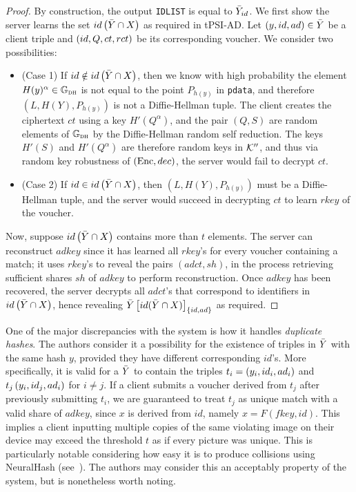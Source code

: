 \begin{proof}
By construction, the output \texttt{IDLIST} is equal to $\bar{Y}_{id}$. We first show the server learns the set  $id \left(\bar{Y} \cap X\right)$ as required in tPSI-AD.  Let $\left(y, id, ad\right) \in \bar{Y}$ be a client triple and $\left(id, Q, ct, rct\right)$ be its corresponding voucher. We consider two possibilities:
\begin{itemize}
    \item (Case 1) If $id \notin id \left(\bar{Y} \cap X\right)$, then we know with high probability the element $H(y)^\alpha \in \mathbb{G}_{\textsc{dh}}$ is not equal to the point $P_{h(y)}$ in \texttt{pdata}, and therefore $(L, H(Y), P_{h(y)})$ is not a Diffie-Hellman tuple. The client creates the ciphertext $ct$ using a key $H'(Q^\alpha)$, and the pair $(Q,S)$ are random elements of $\mathbb{G}_{\textsc{dh}}$ by the Diffie-Hellman random self reduction. The keys $H'(S)$ and $H'(Q^\alpha)$ are therefore random keys in $\mathcal{K}''$, and thus via random key robustness of $(\text{Enc}, dec)$, the server would fail to decrypt $ct$.

    \item (Case 2) If $id \in id \left(\bar{Y} \cap X\right)$, then $(L, H(Y), P_{h(y)})$ must be a Diffie-Hellman tuple, and the server would succeed in decrypting $ct$ to learn $rkey$ of the voucher.
\end{itemize}
Now, suppose $ id \left(\bar{Y} \cap X\right)$ contains more than $t$ elements. The server can reconstruct $adkey$ since it has learned all $rkey$'s for every voucher containing a match; it uses $rkey$'s to reveal the pairs $(adct, sh)$, in the process retrieving sufficient shares $sh$ of $adkey$ to perform reconstruction. Once $adkey$ has been recovered, the server decrypts all $adct$'s that correspond to identifiers in $ id \left(\bar{Y} \cap X\right)$, hence revealing $\bar{Y} \left[id (\bar{Y} \cap X)\right]_{\left\{id, ad\right\}}$ as required.
\end{proof}


\begin{remark}
\label{rmk:dupe}
One of the major discrepancies with the system is how it handles \emph{duplicate hashes}. The authors consider it a possibility for the existence of triples in $\bar{Y} $ with the same hash $y$, provided they have different corresponding $id$'s. More specifically, it is valid for a $\bar{Y}$ to contain the triples $t_i = \left(y_i, id_i, ad_i\right)$ and $t_j \left(y_i, id_j, ad_i\right)$ for $i \neq j$. If a client submits a voucher derived from $t_j$ after previously submitting $t_i$, we are guaranteed to treat $t_j$ as unique match with a valid share of $adkey$, since $x$ is derived from $id$, namely $x = F(fkey,id)$. This implies a client inputting multiple copies of the same violating image on their device may exceed the threshold $t$ as if every picture was unique. This is particularly notable considering how easy it is to produce collisions using NeuralHash (see~\cite{athalyeNeuralHashCollider2021}). The authors may consider this an acceptably property of the system, but is nonetheless worth noting. 
\end{remark}

